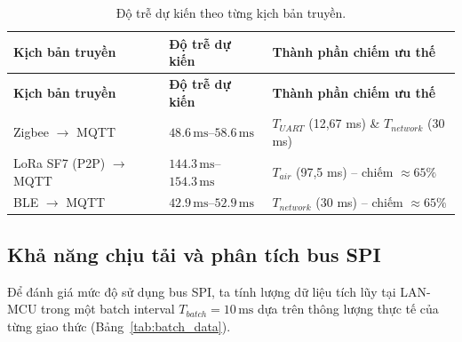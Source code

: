         
        \begin{longtable}{|p{4.5cm}|p{4.5cm}|p{5cm}|}
            \caption{Độ trễ dự kiến theo từng kịch bản truyền.} \label{tab:latency_estimation} \\
            \hline
            \textbf{Kịch bản truyền} & \textbf{Độ trễ dự kiến} & \textbf{Thành phần chiếm ưu thế} \\ \hline
            \endfirsthead
            \hline
            \textbf{Kịch bản truyền} & \textbf{Độ trễ dự kiến} & \textbf{Thành phần chiếm ưu thế} \\ \hline
            \endhead
            \hline
            \endfoot
            \endlastfoot
            Zigbee $\rightarrow$ MQTT & $48{.}6\,\text{ms}$--$58{.}6\,\text{ms}$ & $T_{UART}$ (12,67 ms) \& $T_{network}$ (30 ms) \\ \hline
            LoRa SF7 (P2P) $\rightarrow$ MQTT & $144{.}3\,\text{ms}$--$154{.}3\,\text{ms}$ & $T_{air}$ (97,5 ms) -- chiếm $\approx 65\%$ \\ \hline
            BLE $\rightarrow$ MQTT & $42{.}9\,\text{ms}$--$52{.}9\,\text{ms}$ & $T_{network}$ (30 ms) -- chiếm $\approx 65\%$ \\ \hline
        \end{longtable}
        
        \subsection{Khả năng chịu tải và phân tích bus SPI}
        \label{subsec:spi}
        
        Để đánh giá mức độ sử dụng bus SPI, ta tính lượng dữ liệu tích lũy tại LAN-MCU trong một batch interval $T_{batch} = 10\,\text{ms}$ dựa trên thông lượng thực tế của từng giao thức (Bảng~\ref{tab:batch_data}).
        
